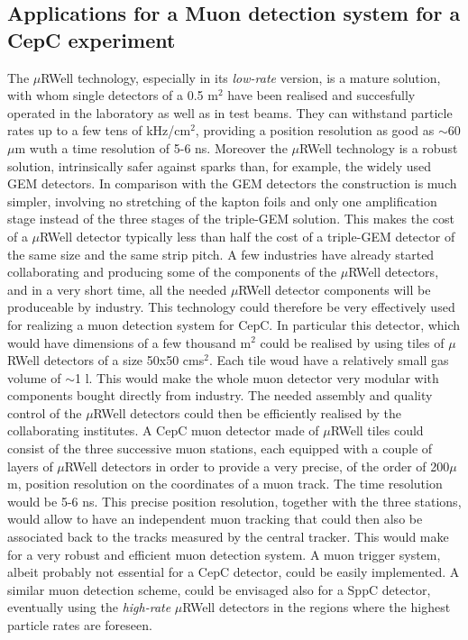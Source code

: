 \subsection{Applications for a Muon detection system for a CepC experiment}
\label{section:Muon-detector}
%
The $\mu$RWell technology, especially in its \textit{low-rate} version, is a mature solution, with whom single detectors of a 0.5 m$^2$ have been realised and succesfully operated in the laboratory as well as in test beams. They can withstand particle rates up to a few tens of kHz/cm$^2$, providing a position resolution as good as $\sim$60 $\mu$m wuth a time resolution of 5-6 ns. Moreover the $\mu$RWell technology is a robust solution, intrinsically safer against sparks than, for example, the widely used GEM detectors. In comparison with the GEM detectors the construction is much simpler, involving no stretching of the kapton foils and only one amplification stage instead of the three stages of the triple-GEM solution. This makes the cost of a $\mu$RWell detector typically less than half the cost of a triple-GEM detector of the same size and the same strip pitch. A few industries have already started collaborating and producing some of the components of the $\mu$RWell detectors, and in a very short time, all the needed $\mu$RWell detector components will be produceable by industry.
This technology could therefore be very effectively used for realizing a muon detection system for CepC. In particular this detector, which would have dimensions of a few thousand m$^2$ could be realised by using tiles of $\mu$RWell detectors of a size 50x50 cms$^2$. Each tile woud have a relatively small gas volume of $\sim$1 l. This would make the whole muon detector very modular with components bought directly from industry. The needed assembly and quality control of the $\mu$RWell detectors could then be efficiently realised by the collaborating institutes.
A CepC muon detector made of $\mu$RWell tiles could consist of the three successive muon stations, each equipped with a couple of layers of $\mu$RWell detectors in order to provide a very precise, of the order of 200$\mu$m, position resolution on the coordinates of a muon track. The time resolution would be 5-6 ns. This precise position resolution, together with the three stations, would allow to have an independent muon tracking that could then also be associated back to the tracks measured by the central tracker. This would make for a very robust and efficient muon detection system. A  muon trigger system, albeit probably not essential for a CepC detector, could be easily implemented.
A similar muon detection scheme, could be envisaged also for a SppC detector, eventually using the \textit{high-rate} $\mu$RWell detectors in the regions where the highest particle rates are foreseen.



